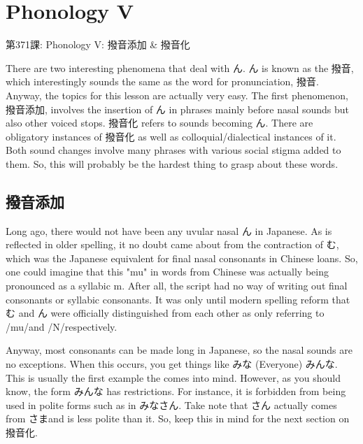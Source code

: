     
\chapter{Phonology V}

\begin{center}
\begin{Large}
第371課: Phonology V: 撥音添加 \& 撥音化 
\end{Large}
\end{center}
 
\par{ There are two interesting phenomena that deal with ん. ん is known as the 撥音, which interestingly sounds the same as the word for pronunciation, 撥音. Anyway, the topics for this lesson are actually very easy. The first phenomenon, 撥音添加, involves the insertion of ん in phrases mainly before nasal sounds but also other voiced stops. 撥音化 refers to sounds becoming ん. There are obligatory instances of 撥音化 as well as colloquial\slash dialectical instances of it. Both sound changes involve many phrases with various social stigma added to them. So, this will probably be the hardest thing to grasp about these words.  }
      
\section{撥音添加}
 
\par{ Long ago, there would not have been any uvular nasal ん in Japanese. As is reflected in older spelling, it no doubt came about from the contraction of む, which was the Japanese equivalent for final nasal consonants in Chinese loans. So, one could imagine that this "mu" in words from Chinese was actually being pronounced as a syllabic m. After all, the script had no way of writing out final consonants or syllabic consonants. It was only until modern spelling reform that む and ん were officially distinguished from each other as only referring to \slash mu\slash  and \slash N\slash  respectively. }

\par{ Anyway, most consonants can be made long in Japanese, so the nasal sounds are no exceptions. When this occurs, you get things like みな (Everyone) \textrightarrow  みんな. This is usually the first example the comes into mind. However, as you should know, the form みんな has restrictions. For instance, it is forbidden from being used in polite forms such as in みなさん. Take note that さん actually comes from さまand is less polite than it. So, keep this in mind for the next section on 撥音化. }

